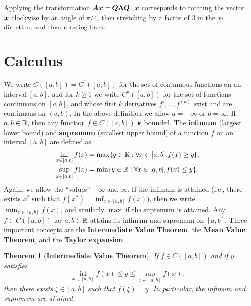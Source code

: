 \documentclass[11pt,a4paper]{memoir}
\newtheorem*{theorem*}{Theorem}
\begin{document}
\begin{example}
\begin{figure}[ht!]
\end{figure}

Applying the transformation $\bm{A}\bm{x} = \bm{Q}\bm{\Lambda}\bm{Q}^{\top}\bm{x}$ corresponds to rotating the vector $\bm{x}$ clockwise by an angle of $\pi/4$, then stretching by a factor of $3$ in the $x$-direction, and then rotating back.
\end{example}

\section{Calculus}
\setcounter{figure}{0}
We write $C([a,b])=C^0([a,b])$ for the set of continuous functions on an interval $[a,b]$, and for $k\geq 1$ we write $C^k([a,b])$ for the set of functions continuous on $[a,b]$, and whose first $k$ derivatives $f',\dots,f^{(k)}$ exist and are continuous on $(a,b)$. In the above definition we allow $a=-\infty$ or $b=\infty$. If $a,b\in \mathbb{R}$, then any function $f\in C([a,b])$ is bounded. The \strictpagecheck{}\textbf{infimum} (largest lower bound) and \textbf{supremum} (smallest upper bound) of a function $f$ on an interval $[a,b]$ are defined as
\begin{align*}
 \inf_{x\in [a,b]} f(x) &= \max\{y\in \mathbb{R} \mathrel{\mathop{:}} \forall x\in [a,b], f(x)\geq y\},\\
  \sup_{x\in [a,b]} f(x) &= \min\{y\in\mathbb{R} \mathrel{\mathop{:}} \forall x\in [a,b], f(x)\leq y\}.
\end{align*}
Again, we allow the ``values'' $-\infty$ and $\infty$. If the infimum is attained (i.e., there exists $x^*$ such that $f(x^*) = \inf_{x\in [a,b]} f(x)$), then we write $\min_{x\in [a,b]}f(x)$, and similarly $\max$ if the supremum is attained. Any $f\in C([a,b])$ for $a,b\in \mathbb{R}$ attains its infimum and supremum on $[a,b]$.
Three important concepts are the \textbf{Intermediate Value Theorem}, the \textbf{Mean Value Theorem}, and the \textbf{Taylor expansion}. 

\begin{theorem*}[\textbf{Intermediate Value Theorem}]
\strictpagecheck
{}If $f\in C([a,b])$ and if $y$ satisfies
\begin{equation*}
\inf_{x\in [a,b]} f(x)\leq y\leq \sup_{x\in [a,b]} f(x),
\end{equation*}
then there exists $\xi \in [a,b]$ such that $f(\xi)=y$. In particular, the infimum and supremum are attained.
\end{theorem*}
\end{document}
